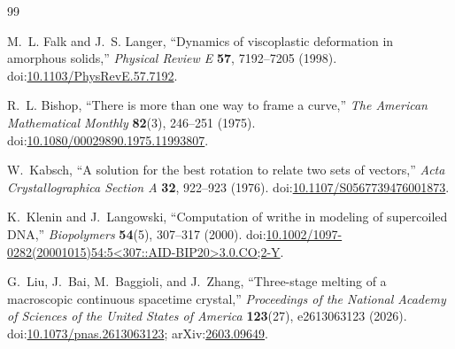 \begin{thebibliography}{99}

M.~L. Falk and J.~S. Langer,
``Dynamics of viscoplastic deformation in amorphous solids,''
\textit{Physical Review E} \textbf{57}, 7192--7205 (1998).
doi:\href{https://doi.org/10.1103/PhysRevE.57.7192}{10.1103/PhysRevE.57.7192}.

R.~L. Bishop,
``There is more than one way to frame a curve,''
\textit{The American Mathematical Monthly} \textbf{82}(3), 246--251 (1975).
doi:\href{https://doi.org/10.1080/00029890.1975.11993807}{10.1080/00029890.1975.11993807}.

W.~Kabsch,
``A solution for the best rotation to relate two sets of vectors,''
\textit{Acta Crystallographica Section A} \textbf{32}, 922--923 (1976).
doi:\href{https://doi.org/10.1107/S0567739476001873}{10.1107/S0567739476001873}.

K.~Klenin and J.~Langowski,
``Computation of writhe in modeling of supercoiled DNA,''
\textit{Biopolymers} \textbf{54}(5), 307--317 (2000).
doi:\href{https://doi.org/10.1002/1097-0282(20001015)54:5<307::AID-BIP20>3.0.CO;2-Y}{10.1002/1097-0282(20001015)54:5<307::AID-BIP20>3.0.CO;2-Y}.

G.~Liu, J.~Bai, M.~Baggioli, and J.~Zhang,
``Three-stage melting of a macroscopic continuous spacetime crystal,''
\textit{Proceedings of the National Academy of Sciences of the United States of America}
\textbf{123}(27), e2613063123 (2026).
doi:\href{https://doi.org/10.1073/pnas.2613063123}{10.1073/pnas.2613063123};
arXiv:\href{https://arxiv.org/abs/2603.09649}{2603.09649}.

\end{thebibliography}
